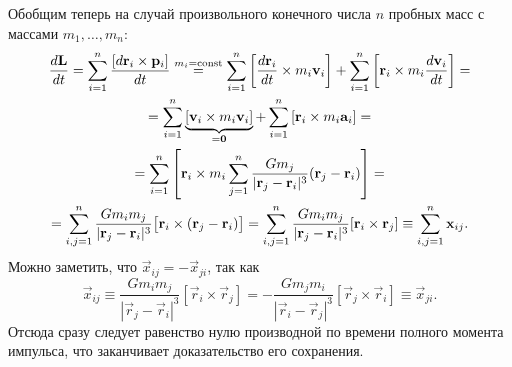Обобщим теперь на случай произвольного конечного числа $n$ пробных масс с массами $m_1, \ldots, m_n$:
\begin{multline*}
	\frac{d\mathbf{L}}{dt} =  \sum\limits_{i=1}^n \frac{[d\mathbf{r}_i \times \mathbf{p}_i]}{dt} \overset{m_i=\operatorname{const}}{=} \sum\limits_{i=1}^n \left[\frac{d\mathbf{r}_i}{dt} \times m_i\mathbf{v}_i \right] + \sum\limits_{i=1}^n \left[\mathbf{r}_i \times m_i \frac{d\mathbf{v}_i}{dt} \right] = \\
	= \sum\limits_{i=1}^n \underbrace{\left[\mathbf{v}_i \times m_i\mathbf{v}_i \right]}_{=\mathbf{0}} + \sum\limits_{i=1}^n \left[\mathbf{r}_i \times m_i \mathbf{a}_i \right] = \\
	= \sum\limits_{i=1}^n \left[ \mathbf{r}_i \times m_i \sum\limits_{j=1}^n \frac{G m_j}{|\mathbf{r}_j - \mathbf{r}_i|^3} (\mathbf{r}_j - \mathbf{r}_i) \right] = \\
	= \sum\limits_{i,j=1}^n \frac{G m_i m_j}{|\mathbf{r}_j - \mathbf{r}_i|^3} \big[\mathbf{r}_i \times (\mathbf{r}_j - \mathbf{r}_i) \big] = \sum\limits_{i,j=1}^n \frac{G m_i m_j}{|\mathbf{r}_j - \mathbf{r}_i|^3} [\mathbf{r}_i \times \mathbf{r}_j] \equiv \sum\limits_{i,j=1}^n \mathbf{x}_{ij}.
\end{multline*}
Можно заметить, что $\vec{x}_{ij} = -\vec{x}_{ji}$, так как
\begin{equation*}
	\vec{x}_{ij} \equiv \frac{G m_i m_j}{|\vec{r}_j - \vec{r}_i|^3} [\vec{r}_i \times \vec{r}_j] = - \frac{G m_j m_i}{|\vec{r}_i - \vec{r}_j|^3} [\vec{r}_j \times \vec{r}_i] \equiv \vec{x}_{ji}.
\end{equation*}
Отсюда сразу следует равенство нулю производной по времени полного момента импульса, что заканчивает доказательство его сохранения.

